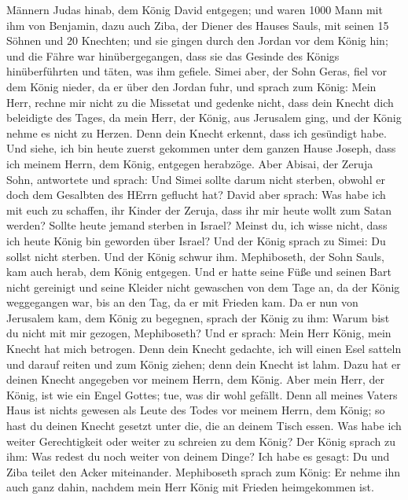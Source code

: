 Männern Judas hinab, dem König David entgegen;  und waren
1000 Mann mit ihm von Benjamin, dazu auch Ziba, der Diener des Hauses
Sauls, mit seinen 15 Söhnen und 20 Knechten; und sie gingen durch den
Jordan vor dem König hin;  und die Fähre war
hinübergegangen, dass sie das Gesinde des Königs hinüberführten und
täten, was ihm gefiele. Simei aber, der Sohn Geras, fiel vor dem König
nieder, da er über den Jordan fuhr,  und sprach zum König:
Mein Herr, rechne mir nicht zu die Missetat und gedenke nicht, dass dein
Knecht dich beleidigte des Tages, da mein Herr, der König, aus Jerusalem
ging, und der König nehme es nicht zu Herzen.  Denn dein
Knecht erkennt, dass ich gesündigt habe. Und siehe, ich bin heute zuerst
gekommen unter dem ganzen Hause Joseph, dass ich meinem Herrn, dem
König, entgegen herabzöge.  Aber Abisai, der Zeruja Sohn,
antwortete und sprach: Und Simei sollte darum nicht sterben, obwohl er
doch dem Gesalbten des HErrn geflucht hat?  David aber
sprach: Was habe ich mit euch zu schaffen, ihr Kinder der Zeruja, dass
ihr mir heute wollt zum Satan werden? Sollte heute jemand sterben in
Israel? Meinst du, ich wisse nicht, dass ich heute König bin geworden
über Israel?  Und der König sprach zu Simei: Du sollst
nicht sterben. Und der König schwur ihm.  Mephiboseth, der
Sohn Sauls, kam auch herab, dem König entgegen. Und er hatte seine Füße
und seinen Bart nicht gereinigt und seine Kleider nicht gewaschen von
dem Tage an, da der König weggegangen war, bis an den Tag, da er mit
Frieden kam.  Da er nun von Jerusalem kam, dem König zu
begegnen, sprach der König zu ihm: Warum bist du nicht mit mir gezogen,
Mephiboseth?  Und er sprach: Mein Herr König, mein Knecht
hat mich betrogen. Denn dein Knecht gedachte, ich will einen Esel
satteln und darauf reiten und zum König ziehen; denn dein Knecht ist
lahm.  Dazu hat er deinen Knecht angegeben vor meinem
Herrn, dem König. Aber mein Herr, der König, ist wie ein Engel Gottes;
tue, was dir wohl gefällt.  Denn all meines Vaters Haus ist
nichts gewesen als Leute des Todes vor meinem Herrn, dem König; so hast
du deinen Knecht gesetzt unter die, die an deinem Tisch essen. Was habe
ich weiter Gerechtigkeit oder weiter zu schreien zu dem König?
 Der König sprach zu ihm: Was redest du noch weiter von
deinem Dinge? Ich habe es gesagt: Du und Ziba teilet den Acker
miteinander.  Mephiboseth sprach zum König: Er nehme ihn
auch ganz dahin, nachdem mein Herr König mit Frieden heimgekommen ist.
